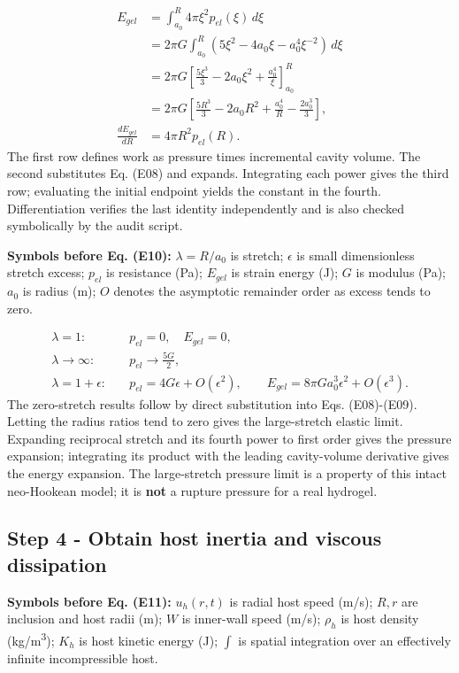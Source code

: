 \documentclass[10pt,a4paper]{article}
\begin{document}
{\small\begin{align*}
E_{gel}
&=\int_{a_0}^{R}4\pi\xi^2p_{el}(\xi)\,d\xi\\
&=2\pi G\int_{a_0}^{R}(5\xi^2-4a_0\xi-a_0^4\xi^{-2})\,d\xi\\
&=2\pi G\left[\frac{5\xi^3}{3}-2a_0\xi^2+\frac{a_0^4}{\xi}\right]_{a_0}^{R}\\
&=2\pi G\left[\frac{5R^3}{3}-2a_0R^2+\frac{a_0^4}{R}-\frac{2a_0^3}{3}\right],\\
\frac{dE_{gel}}{dR}&=4\pi R^2p_{el}(R). \tag{E09}
\end{align*}}
The first row defines work as pressure times incremental cavity volume. The second substitutes Eq. (E08) and expands. Integrating each power gives the third row; evaluating the initial endpoint yields the constant in the fourth. Differentiation verifies the last identity independently and is also checked symbolically by the audit script.

\textbf{Symbols before Eq. (E10):} $\lambda=R/a_0$ is stretch; $\epsilon$ is small dimensionless stretch excess; $p_{el}$ is resistance (Pa); $E_{gel}$ is strain energy (J); $G$ is modulus (Pa); $a_0$ is radius (m); $O$ denotes the asymptotic remainder order as excess tends to zero.

{\small\begin{align*}
\lambda=1:&\quad p_{el}=0,\quad E_{gel}=0,\\
\lambda\to\infty:&\quad p_{el}\to\frac{5G}{2},\\
\lambda=1+\epsilon:&\quad p_{el}=4G\epsilon+O(\epsilon^2),\qquad
E_{gel}=8\pi G a_0^3\epsilon^2+O(\epsilon^3). \tag{E10}
\end{align*}}
The zero-stretch results follow by direct substitution into Eqs. (E08)-(E09). Letting the radius ratios tend to zero gives the large-stretch elastic limit. Expanding reciprocal stretch and its fourth power to first order gives the pressure expansion; integrating its product with the leading cavity-volume derivative gives the energy expansion. The large-stretch pressure limit is a property of this intact neo-Hookean model; it is \textbf{not} a rupture pressure for a real hydrogel.

\subsection*{Step 4  -  Obtain host inertia and viscous dissipation}
\textbf{Symbols before Eq. (E11):} $u_h(r,t)$ is radial host speed (m/s); $R,r$ are inclusion and host radii (m); $W$ is inner-wall speed (m/s); $\rho_h$ is host density (kg/m\textsuperscript{3}); $K_h$ is host kinetic energy (J); $\int$ is spatial integration over an effectively infinite incompressible host.
\end{document}
